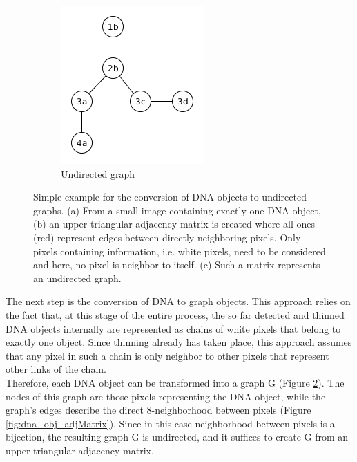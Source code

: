 \documentclass{article}
\begin{document}
\begin{figure}[!htbp]
\begin{subfigure}{0.25\textwidth}
		\includegraphics[width=\linewidth]{small_DNA_obj_graph.png}
		\caption{Undirected graph}
		\label{fig:dna_obj_graph}
	\end{subfigure}
	\caption{Simple example for the conversion of DNA objects to undirected graphs.
		(a) From a small image containing exactly one DNA object, (b) an upper triangular adjacency matrix is created where all ones (red) represent edges between directly neighboring pixels. Only pixels containing information, i.e. white pixels, need to be considered and here, no pixel is neighbor to itself. (c) Such a matrix represents an undirected graph.}
	\label{fig:dna_graph_creation}
\end{figure}
The next step is the conversion of DNA to graph objects. This approach relies on the fact that, at this stage of the entire process, the so far detected and thinned DNA objects internally are represented as chains of white pixels that belong to exactly one object. Since thinning already has taken place, this approach assumes that any pixel in such a chain is only neighbor to other pixels that represent other links of the chain.\\
Therefore, each DNA object can be transformed into a graph G (Figure \ref{fig:dna_graph_creation}). The nodes of this graph are those pixels representing the DNA object, while the graph's edges describe the direct 8-neighborhood between pixels (Figure \ref{fig:dna_obj_adjMatrix}). Since in this case neighborhood between pixels is a bijection, the resulting graph G is undirected, and it suffices to create G from an upper triangular adjacency matrix.\\
\end{document}
